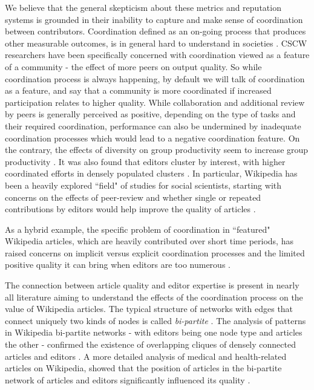 We believe that the general skepticism about these metrics and reputation systems is grounded in their inability to capture and make sense of coordination between contributors. Coordination defined as an on-going process that produces other measurable outcomes, is in general hard to understand in societies \cite{ostrom1990}. CSCW researchers have been specifically concerned with coordination viewed as a feature of a community - the effect of more peers on output quality. So while coordination process is always happening, by default we will talk of coordination as a feature, and say that a community is more coordinated if increased participation relates to higher quality. While collaboration and additional review by peers is generally perceived as positive, depending on the type of tasks and their required coordination, performance can also be undermined by inadequate coordination processes \cite{kittur2009coordination} which would lead to a negative coordination feature. On the contrary, the effects of diversity on group productivity seem to increase group productivity \cite{chen2010}. It was also found that editors cluster by interest, with higher coordinated efforts in densely populated clusters \cite{jesus2009}. In particular, Wikipedia has been a heavily explored ``field" of studies for social scientists, starting with concerns on the effects of peer-review and whether single or repeated contributions by editors would help improve the quality of articles \cite{hu2007articlequality,wilkinson2007}. 

As a hybrid example, the specific problem of coordination in ``featured" Wikipedia articles, which are heavily contributed over short time periods, has raised concerns on implicit versus explicit coordination processes and the limited positive quality it can bring when editors are too numerous \cite{kittur2008}.
 
The connection between article quality and editor expertise is present in nearly all literature aiming to understand the effects of the coordination process on the value of Wikipedia articles. The typical structure of networks with edges that connect uniquely two kinds of nodes is called {\it bi-partite} \cite{newman2001}. The analysis of patterns in Wikipedia bi-partite networks - with editors being one node type and articles the other - confirmed the existence of overlapping cliques of densely connected articles and editors  \cite{jesus2009}. A more detailed analysis of medical and health-related articles on Wikipedia, showed that the position of articles in the bi-partite network of articles and editors significantly influenced its quality \cite{kane2009}. 


